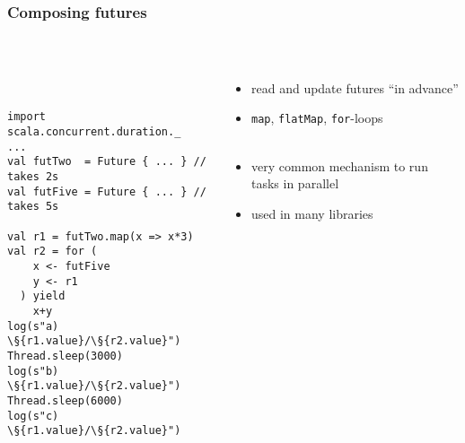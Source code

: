 \documentclass[aspectratio=169]{beamer}
\begin{document}
\begin{frame}[fragile]\frametitle{Composing futures}
~\\[-8mm]
\begin{columns}
\begin{column}{0.56\textwidth}
~\\
\begin{lstlisting}[emph={execute,sleep,log,Future,Try,Success,Failure,onComplete,Await,result,ready}]
import scala.concurrent.duration._
...
val futTwo  = Future { ... } // takes 2s
val futFive = Future { ... } // takes 5s

val r1 = futTwo.map(x => x*3)
val r2 = for (
    x <- futFive
    y <- r1
  ) yield 
    x+y
log(s"a) \§{r1.value}/\§{r2.value}")
Thread.sleep(3000)
log(s"b) \§{r1.value}/\§{r2.value}")
Thread.sleep(6000)
log(s"c) \§{r1.value}/\§{r2.value}")
\end{lstlisting}
\end{column}
\begin{column}{0.46\textwidth}
\begin{itemize}
  \item read and update futures ``in advance''
  \item \texttt{map}, \texttt{flatMap}, \texttt{for}-loops
  \\~\pause
  \item very common mechanism to run tasks in parallel
  \item used in many libraries
\end{itemize}
\end{column}
\end{columns}
\end{frame}
\end{document}
